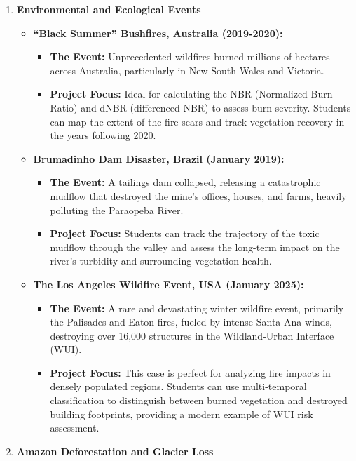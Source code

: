 \documentclass{article}
\begin{document}
\begin{enumerate}
    \item \textbf{Environmental and Ecological Events}
    \begin{itemize}
        \item \textbf{``Black Summer'' Bushfires, Australia (2019-2020):}
        \begin{itemize}
            \item \textbf{The Event:} Unprecedented wildfires burned millions of hectares across Australia, particularly in New South Wales and Victoria.
            \item \textbf{Project Focus:} Ideal for calculating the NBR (Normalized Burn Ratio) and dNBR (differenced NBR) to assess burn severity. Students can map the extent of the fire scars and track vegetation recovery in the years following 2020.
        \end{itemize}
        \item \textbf{Brumadinho Dam Disaster, Brazil (January 2019):}
        \begin{itemize}
            \item \textbf{The Event:} A tailings dam collapsed, releasing a catastrophic mudflow that destroyed the mine's offices, houses, and farms, heavily polluting the Paraopeba River.
            \item \textbf{Project Focus:} Students can track the trajectory of the toxic mudflow through the valley and assess the long-term impact on the river's turbidity and surrounding vegetation health.
        \end{itemize}
        \item \textbf{The Los Angeles Wildfire Event, USA (January 2025):}
        \begin{itemize}
            \item \textbf{The Event:} A rare and devastating winter wildfire event, primarily the Palisades and Eaton fires, fueled by intense Santa Ana winds, destroying over 16,000 structures in the Wildland-Urban Interface (WUI).
            \item \textbf{Project Focus:} This case is perfect for analyzing fire impacts in densely populated regions. Students can use multi-temporal classification to distinguish between burned vegetation and destroyed building footprints, providing a modern example of WUI risk assessment.
        \end{itemize}
    \end{itemize}
    \item \textbf{Amazon Deforestation and Glacier Loss}

\end{enumerate}
\end{document}
